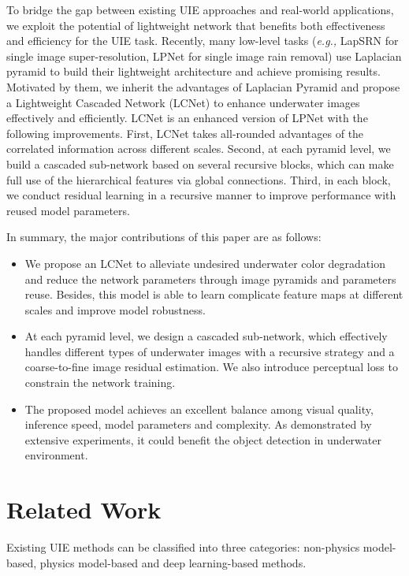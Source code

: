 \documentclass[journal]{IEEEtran}
\begin{document}
To bridge the gap between existing UIE approaches and real-world applications, we exploit the potential of lightweight network that benefits both effectiveness and efficiency for the UIE task. Recently, many low-level tasks (\textit{e.g.,} LapSRN \cite{lai2018fast} for single image super-resolution, LPNet \cite{fu2019lightweight} for single image rain removal) use Laplacian pyramid to build their lightweight architecture and achieve promising results. Motivated by them, we inherit the advantages of Laplacian Pyramid and propose a Lightweight Cascaded Network (LCNet) to enhance underwater images effectively and efficiently. LCNet is an enhanced version of LPNet \cite{fu2019lightweight} with the following improvements. First, LCNet takes all-rounded advantages of the correlated information across different scales. Second, at each pyramid level, we build a cascaded sub-network based on several recursive blocks, which can make full use of the hierarchical features via global connections. Third, in each block, we conduct residual learning in a recursive manner to improve performance with reused model parameters.

In summary, the major contributions of this paper are as follows:
\begin{itemize}
\item We propose an LCNet to alleviate undesired underwater color degradation and reduce the network parameters through image pyramids and parameters reuse. Besides, this model is able to learn complicate feature maps at different scales and improve model robustness.


 
\item At each pyramid level, we design a cascaded sub-network, which effectively handles different types of underwater images with a recursive strategy and a coarse-to-fine image residual estimation. We also introduce perceptual loss to constrain the network training.


\item The proposed model achieves an excellent balance among visual quality, inference speed, model parameters and complexity. As demonstrated by extensive experiments, it could benefit the object detection in underwater environment.
\end{itemize}



\section{Related Work}
Existing UIE methods can be classified into three categories:
non-physics model-based, physics model-based and deep
learning-based methods. 
\end{document}
